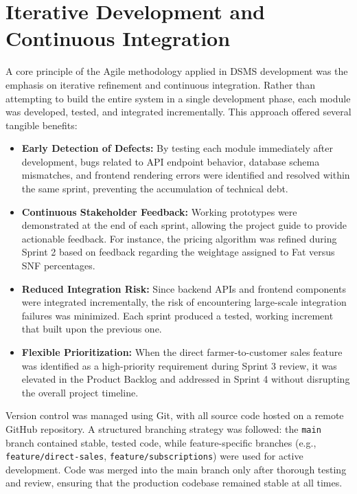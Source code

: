\documentclass[12pt,a4paper]{report}
\begin{document}
\section{Iterative Development and Continuous Integration}
\vspace{0.5cm}
A core principle of the Agile methodology applied in DSMS development was the emphasis on iterative refinement and continuous integration. Rather than attempting to build the entire system in a single development phase, each module was developed, tested, and integrated incrementally. This approach offered several tangible benefits:

\begin{itemize}
    \item \textbf{Early Detection of Defects:} By testing each module immediately after development, bugs related to API endpoint behavior, database schema mismatches, and frontend rendering errors were identified and resolved within the same sprint, preventing the accumulation of technical debt.
    \item \textbf{Continuous Stakeholder Feedback:} Working prototypes were demonstrated at the end of each sprint, allowing the project guide to provide actionable feedback. For instance, the pricing algorithm was refined during Sprint 2 based on feedback regarding the weightage assigned to Fat versus SNF percentages.
    \item \textbf{Reduced Integration Risk:} Since backend APIs and frontend components were integrated incrementally, the risk of encountering large-scale integration failures was minimized. Each sprint produced a tested, working increment that built upon the previous one.
    \item \textbf{Flexible Prioritization:} When the direct farmer-to-customer sales feature was identified as a high-priority requirement during Sprint 3 review, it was elevated in the Product Backlog and addressed in Sprint 4 without disrupting the overall project timeline.
\end{itemize}

Version control was managed using Git, with all source code hosted on a remote GitHub repository. A structured branching strategy was followed: the \texttt{main} branch contained stable, tested code, while feature-specific branches (e.g., \texttt{feature/direct-sales}, \texttt{feature/subscriptions}) were used for active development. Code was merged into the main branch only after thorough testing and review, ensuring that the production codebase remained stable at all times.
\end{document}

